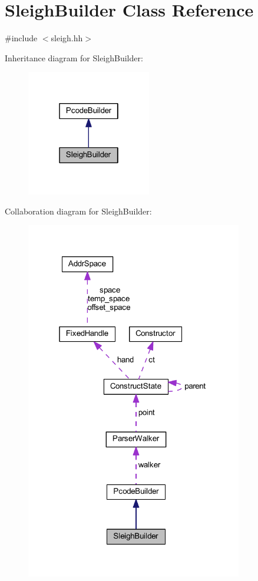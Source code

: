 \hypertarget{class_sleigh_builder}{}\section{Sleigh\+Builder Class Reference}
\label{class_sleigh_builder}


{\ttfamily \#include $<$sleigh.\+hh$>$}



Inheritance diagram for Sleigh\+Builder\+:
\nopagebreak
\begin{figure}[H]
\begin{center}
\leavevmode
\includegraphics[width=154pt]{class_sleigh_builder__inherit__graph}
\end{center}
\end{figure}


Collaboration diagram for Sleigh\+Builder\+:
\nopagebreak
\begin{figure}[H]
\begin{center}
\leavevmode
\includegraphics[width=268pt]{class_sleigh_builder__coll__graph}
\end{center}
\end{figure}
